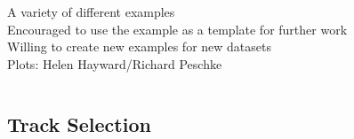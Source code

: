 \documentclass{beamer}
\begin{document}
\begin{frame}
\begin{columns}[t]
\tiny{
\vspace{10pt}
A variety of different examples  \\ 
\vspace{10pt} 
Encouraged to use the example as a template for further work \\
\vspace{10pt}
Willing to create new examples for new datasets \\
\vspace{10pt}
Plots: Helen Hayward/Richard Peschke
}
\end{columns}
\end{frame}


\subsection{Track Selection}
\end{document}
